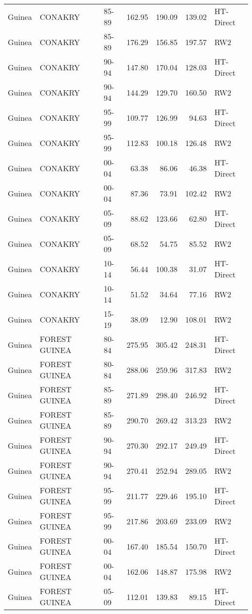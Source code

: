 \begin{longtable}{lllrrrl}
  Guinea & CONAKRY & 85-89 & 162.95 & 190.09 & 139.02 & HT-Direct \\ 
  Guinea & CONAKRY & 85-89 & 176.29 & 156.85 & 197.57 & RW2 \\ 
  Guinea & CONAKRY & 90-94 & 147.80 & 170.04 & 128.03 & HT-Direct \\ 
  Guinea & CONAKRY & 90-94 & 144.29 & 129.70 & 160.50 & RW2 \\ 
  Guinea & CONAKRY & 95-99 & 109.77 & 126.99 & 94.63 & HT-Direct \\ 
  Guinea & CONAKRY & 95-99 & 112.83 & 100.18 & 126.48 & RW2 \\ 
  Guinea & CONAKRY & 00-04 & 63.38 & 86.06 & 46.38 & HT-Direct \\ 
  Guinea & CONAKRY & 00-04 & 87.36 & 73.91 & 102.42 & RW2 \\ 
  Guinea & CONAKRY & 05-09 & 88.62 & 123.66 & 62.80 & HT-Direct \\ 
  Guinea & CONAKRY & 05-09 & 68.52 & 54.75 & 85.52 & RW2 \\ 
  Guinea & CONAKRY & 10-14 & 56.44 & 100.38 & 31.07 & HT-Direct \\ 
  Guinea & CONAKRY & 10-14 & 51.52 & 34.64 & 77.16 & RW2 \\ 
  Guinea & CONAKRY & 15-19 & 38.09 & 12.90 & 108.01 & RW2 \\ 
  Guinea & FOREST GUINEA & 80-84 & 275.95 & 305.42 & 248.31 & HT-Direct \\ 
  Guinea & FOREST GUINEA & 80-84 & 288.06 & 259.96 & 317.83 & RW2 \\ 
  Guinea & FOREST GUINEA & 85-89 & 271.89 & 298.40 & 246.92 & HT-Direct \\ 
  Guinea & FOREST GUINEA & 85-89 & 290.70 & 269.42 & 313.23 & RW2 \\ 
  Guinea & FOREST GUINEA & 90-94 & 270.30 & 292.17 & 249.49 & HT-Direct \\ 
  Guinea & FOREST GUINEA & 90-94 & 270.41 & 252.94 & 289.05 & RW2 \\ 
  Guinea & FOREST GUINEA & 95-99 & 211.77 & 229.46 & 195.10 & HT-Direct \\ 
  Guinea & FOREST GUINEA & 95-99 & 217.86 & 203.69 & 233.09 & RW2 \\ 
  Guinea & FOREST GUINEA & 00-04 & 167.40 & 185.54 & 150.70 & HT-Direct \\ 
  Guinea & FOREST GUINEA & 00-04 & 162.06 & 148.87 & 175.98 & RW2 \\ 
  Guinea & FOREST GUINEA & 05-09 & 112.01 & 139.83 & 89.15 & HT-Direct \\ 

\end{longtable}
